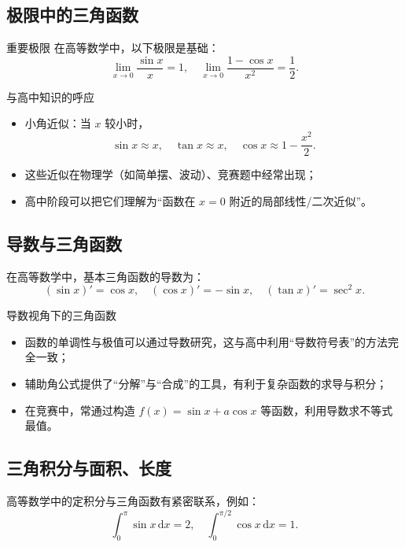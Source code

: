 \documentclass[a4paper,11pt]{ctexart}
\begin{document}
\subsection{极限中的三角函数}

\begin{theorembox}{重要极限}
在高等数学中，以下极限是基础：
\[
\lim_{x\to 0}\frac{\sin x}{x} = 1,\quad
\lim_{x\to 0}\frac{1-\cos x}{x^2} = \frac{1}{2}.
\]
\end{theorembox}

\begin{summarybox}{与高中知识的呼应}
\begin{itemize}
  \item 小角近似：当 $x$ 较小时，
  \[
  \sin x \approx x,\quad \tan x \approx x,\quad \cos x \approx 1-\frac{x^2}{2}.
  \]
  \item 这些近似在物理学（如简单摆、波动）、竞赛题中经常出现；
  \item 高中阶段可以把它们理解为“函数在 $x=0$ 附近的局部线性/二次近似”。
\end{itemize}
\end{summarybox}

\subsection{导数与三角函数}

在高等数学中，基本三角函数的导数为：
\[
(\sin x)' = \cos x,\quad
(\cos x)' = -\sin x,\quad
(\tan x)' = \sec^2 x.
\]

\begin{summarybox}{导数视角下的三角函数}
\begin{itemize}
  \item 函数的单调性与极值可以通过导数研究，这与高中利用“导数符号表”的方法完全一致；
  \item 辅助角公式提供了“分解”与“合成”的工具，有利于复杂函数的求导与积分；
  \item 在竞赛中，常通过构造 $f(x)=\sin x + a\cos x$ 等函数，利用导数求不等式最值。
\end{itemize}
\end{summarybox}

\subsection{三角积分与面积、长度}

高等数学中的定积分与三角函数有紧密联系，例如：
\[
\int_0^\pi \sin x\,\mathrm{d}x = 2,\quad
\int_0^{\pi/2} \cos x\,\mathrm{d}x = 1.
\]
\end{document}
